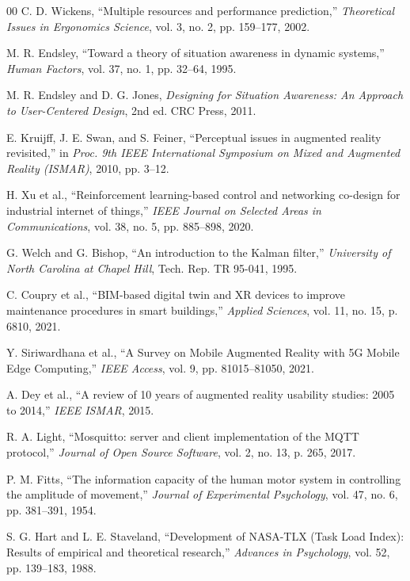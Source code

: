 \documentclass[conference]{IEEEtran}
\begin{document}
\begin{thebibliography}{00}
 C. D. Wickens, ``Multiple resources and performance prediction,'' \textit{Theoretical Issues in Ergonomics Science}, vol. 3, no. 2, pp. 159--177, 2002.

 M. R. Endsley, ``Toward a theory of situation awareness in dynamic systems,'' \textit{Human Factors}, vol. 37, no. 1, pp. 32--64, 1995.

 M. R. Endsley and D. G. Jones, \textit{Designing for Situation Awareness: An Approach to User-Centered Design}, 2nd ed. CRC Press, 2011.

 E. Kruijff, J. E. Swan, and S. Feiner, ``Perceptual issues in augmented reality revisited,'' in \textit{Proc. 9th IEEE International Symposium on Mixed and Augmented Reality (ISMAR)}, 2010, pp. 3--12.

 H. Xu et al., ``Reinforcement learning-based control and networking co-design for industrial internet of things,'' \textit{IEEE Journal on Selected Areas in Communications}, vol. 38, no. 5, pp. 885--898, 2020.

 G. Welch and G. Bishop, ``An introduction to the Kalman filter,'' \textit{University of North Carolina at Chapel Hill}, Tech. Rep. TR 95-041, 1995.

 C. Coupry et al., ``BIM-based digital twin and XR devices to improve maintenance procedures in smart buildings,'' \textit{Applied Sciences}, vol. 11, no. 15, p. 6810, 2021.

 Y. Siriwardhana et al., ``A Survey on Mobile Augmented Reality with 5G Mobile Edge Computing,'' \textit{IEEE Access}, vol. 9, pp. 81015--81050, 2021.

 A. Dey et al., ``A review of 10 years of augmented reality usability studies: 2005 to 2014,'' \textit{IEEE ISMAR}, 2015.

 R. A. Light, ``Mosquitto: server and client implementation of the MQTT protocol,'' \textit{Journal of Open Source Software}, vol. 2, no. 13, p. 265, 2017.

 P. M. Fitts, ``The information capacity of the human motor system in controlling the amplitude of movement,'' \textit{Journal of Experimental Psychology}, vol. 47, no. 6, pp. 381--391, 1954.

 S. G. Hart and L. E. Staveland, ``Development of NASA-TLX (Task Load Index): Results of empirical and theoretical research,'' \textit{Advances in Psychology}, vol. 52, pp. 139--183, 1988.


\end{thebibliography}
\end{document}
